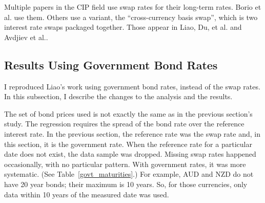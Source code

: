 

Multiple papers in the CIP field use swap rates for their long-term rates.  Borio et al.\cite{Borio2016} use them.  Others use a variant, the ``cross-currency basis swap'', which is two interest rate swaps packaged together.  Those appear in Liao\cite{Liao2016}, Du, et al.\cite{Du2017} and Avdjiev et al.\cite{Avdjiev2016}.  







\subsection{Results Using Government Bond Rates}

I reproduced Liao's work using government bond rates, instead of the swap rates.  In this subsection, I describe the changes to the analysis and the results.


The set of bond prices used is not exactly the same as in the previous section's study.  The regression requires the spread of the bond rate over the reference interest rate.  In the previous section, the reference rate was the swap rate and, in this section, it is the government rate.  When the reference rate for a particular date does not exist, the data sample was dropped.  Missing swap rates happened occasionally, with no particular pattern.  With government rates, it was more systematic.  (See Table~\ref{govt_maturities}.)  For example, AUD and NZD do not have 20 year bonds; their maximum is 10 years.  So, for those currencies, only data within 10 years of the measured date was used.

